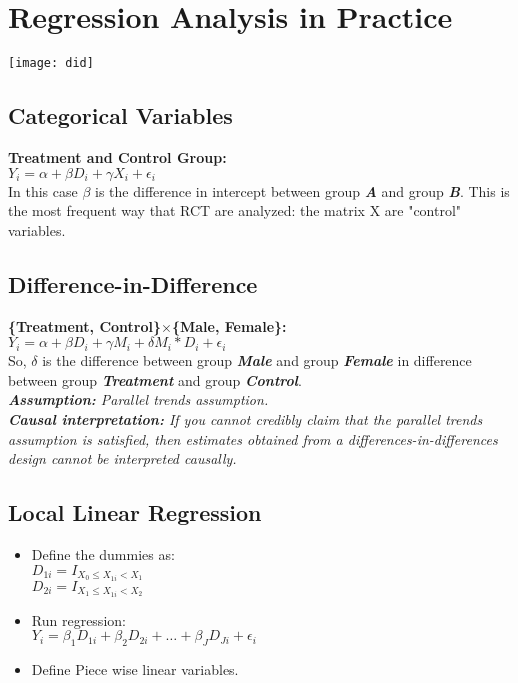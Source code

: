 \section{Regression Analysis in Practice}
\texttt{[image: did]}

\subsection*{Categorical Variables}
\textbf{Treatment and Control Group: } \\
$Y_i=\alpha+\beta D_i + \gamma X_i + \epsilon_i$\\
In this case $\beta$ is the difference in intercept between group \textbf{\textit{A}} and group \textbf{\textit{B}}. This is the most frequent way that RCT are analyzed: the matrix X are "control" variables. 

\subsection*{Difference-in-Difference}
\textbf{\{Treatment, Control\}$\times$\{Male, Female\}: } \\
$Y_i=\alpha+\beta D_i + \gamma M_i + \delta M_i \ast D_i + \epsilon_i$ \\
So, $\delta$ is the difference between group \textbf{\textit{Male}} and group \textbf{\textit{Female}} in difference between group \textbf{\textit{Treatment}} and group \textbf{\textit{Control}}. \\
\textit{\textbf{Assumption: }Parallel trends assumption. }\\
\textit{\textbf{Causal interpretation: }If you cannot credibly claim that the parallel trends assumption is satisfied, then estimates obtained from a differences-in-differences design cannot be interpreted causally. }

\subsection*{Local Linear Regression}
\begin{itemize}
    \item Define the dummies as: \\
    $D_{1i} = I_{X_0 \leq X_{1i} < X_1}$\\
    $D_{2i} = I_{X_1 \leq X_{1i} < X_2}$
    \item Run regression: \\
    $Y_i=\beta_1 D_{1i} + \beta_2 D_{2i} + \dots + \beta_J D_{Ji} + \epsilon_i$
    \item Define Piece wise linear variables. 
\end{itemize}

